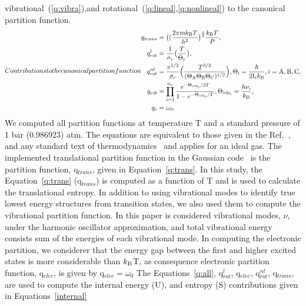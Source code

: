 \documentclass[prb,aps,preprint,showkeys,showpacs]{revtex4}
\begin{document}
vibrational~(\ref{q:vibra}),and rotational~(\ref{q:lineal},\ref{q:nonlineal})
to the canonical partition function.
\begin{subequations}
  \label{q:all}
Contributions to the canonical partition function
\begin{align}
      q_{trans}  &=\big((\frac{2\pi m k_{\textup{B}}T}{h^2}\big)^{\frac{3}{2}} \frac{k_{\textup{B}}T}{P},  \label{q:trans} \\
      q^{l}_{rot} &=\frac{1}{\sigma_r}\big(\frac{T}{\Theta_r}\big), \label{q:lineal}\\
      q^{nl}_{rot} &=\frac{\pi^{1/2}}{\sigma_r}\Big(\frac{T^{3/2}}{ (\Theta_{\textup{A}}{\Theta_{\textup{B}}\Theta_{\textup{C}}})^{1/2}}\Big),\Theta_{\text{i}}=\frac{\hbar}{2\textup{I}_{i}k_{\textup{B}}}, i=\textup{A},\textup{B},\textup{C}, \label{q:nonlineal}\\
      q_{vib} &=\prod_{i=1}^{n_{\nu}} \frac{e^{-\Theta_{{\textup{vib}_i}}/2T}}{1-{e^{-\Theta_{{\textup{vib}_i}}/T}}}, \Theta_{{\textup{vib}_i}}=\frac{h\nu_i}{k_{\textup{B}}},\label{q:vibra}\\ 
       q_{e} &=\omega_0,\label{q:ele}
\end{align}
\end{subequations}
We computed all partition functions at temperature T and a standard pressure of 1 bar (0.986923) atm.  The equations are equivalent to those given in the Ref.~\cite{Dzib}, and any standard text of thermodynamics~\cite{mcquarrie1975statistical,hill1986introduction} and applies for an ideal gas.  The implemented translational partition function in the Gaussian code~\cite{gauss} is the partition function, q$_{trans}$, given in Equation~\ref{q:trans}. In this study, the Equation~\ref{q:trans} (q$_{trans}$) is computed as a  function of T and is used to calculate the translational entropy.
In addition to using vibrational modes to identify true lowest energy structures from transition states, we also used them to compute the vibrational partition function. In this paper is considered vibrational modes, $\nu$, under the harmonic oscillator approximation, and total vibrational energy consists sum of the energies of each vibrational mode. In computing the electronic partition, we considerer that the energy gap between the first and higher excited states is more considerable than $k_{\textup{B}}$T, as consequence electronic partition function, q$_{elec}$, is given by q$_{elec}=\omega_0$ The Equations~\ref{q:all}, q$^{l}_{rot}$, q$_{elec}$, q$^{nl}_{rot}$, q$_{trans}$, are used to compute the internal energy (U), and entropy (S) contributions given in Equations~\ref{internal} %
\end{document}
